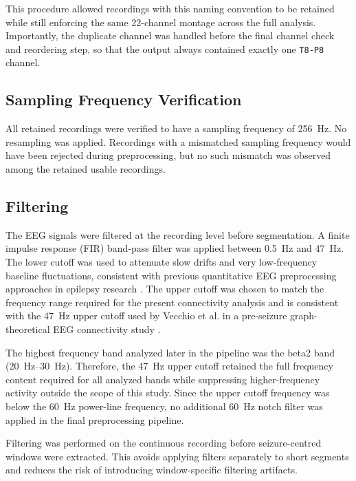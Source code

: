 This procedure allowed recordings with this naming convention to be retained
while still enforcing the same \num{22}-channel montage across the full
analysis. Importantly, the duplicate channel was handled before the final
channel check and reordering step, so that the output always contained exactly
one \texttt{T8-P8} channel.

\subsection{Sampling Frequency Verification}
\label{subsec:sampling-frequency-verification}

All retained recordings were verified to have a sampling frequency of
\SI{256}{\hertz}. No resampling was applied. Recordings with a mismatched
sampling frequency would have been rejected during preprocessing, but no such
mismatch was observed among the retained usable recordings.

\subsection{Filtering}
\label{subsec:eeg-filtering}
The EEG signals were filtered at the recording level before segmentation. A
finite impulse response (FIR) band-pass filter was applied between
\SI{0.5}{\hertz} and \SI{47}{\hertz}. The lower cutoff was used to attenuate
slow drifts and very low-frequency baseline fluctuations, consistent with
previous quantitative EEG preprocessing approaches in epilepsy research
\cite{Lanzone2022}. The upper cutoff was chosen to match the frequency range
required for the present connectivity analysis and is consistent with the
\SI{47}{\hertz} upper cutoff used by Vecchio et al. in a pre-seizure
graph-theoretical EEG connectivity study \cite{Vecchio2016}.

The highest frequency band analyzed later in the pipeline was the beta2 band
(\SIrange{20}{30}{\hertz}). Therefore, the \SI{47}{\hertz} upper cutoff retained
the full frequency content required for all analyzed bands while suppressing
higher-frequency activity outside the scope of this study. Since the upper
cutoff frequency was below the \SI{60}{\hertz} power-line frequency, no
additional \SI{60}{\hertz} notch filter was applied in the final preprocessing
pipeline.

Filtering was performed on the continuous recording before seizure-centred
windows were extracted. This avoids applying filters separately to short
segments and reduces the risk of introducing window-specific filtering
artifacts.

